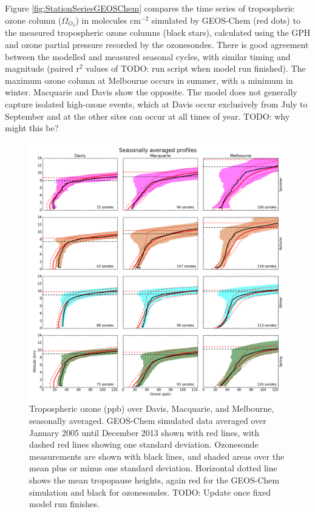 \documentclass{article}
\begin{document}
  Figure \ref{fig:StationSeriesGEOSChem} compares the time series of tropospheric ozone column ($\Omega_{O_3}$) in molecules cm$^{-2}$ simulated by GEOS-Chem (red dots) to the measured tropospheric ozone columns (black stars), calculated using the GPH and ozone partial pressure recorded by the ozonesondes.
  There is good agreement between the modelled and measured seasonal cycles, with similar timing and magnitude (paired r$^2$ values of TODO: run script when model run finished). 
  The maximum ozone column at Melbourne occurs in summer, with a minimum in winter. Macquarie and Davis show the opposite. 
  The model does not generally capture isolated high-ozone events, which at Davis occur exclusively from July to September and at the other sites can occur at all times of year. TODO: why might this be?
  
  \begin{figure}[!htbp]
    \includegraphics[width=\textwidth]{figures/seasonalprofiles00.png}
    \caption{Tropospheric ozone (ppb) over Davis, Macquarie, and Melbourne, seasonally averaged.
    GEOS-Chem simulated data averaged over January 2005 until December 2013 shown with red lines, with dashed red lines showing one standard deviation.
    Ozonesonde measurements are shown with black lines, and shaded areas over the mean plus or minus one standard deviation.
    Horizontal dotted line shows the mean tropopause heights, again red for the GEOS-Chem simulation and black for ozonesondes.
    TODO: Update once fixed model run finishes.}
    \label{fig:GEOSChemSeasonalProfiles}
  \end{figure}
  
\end{document}
